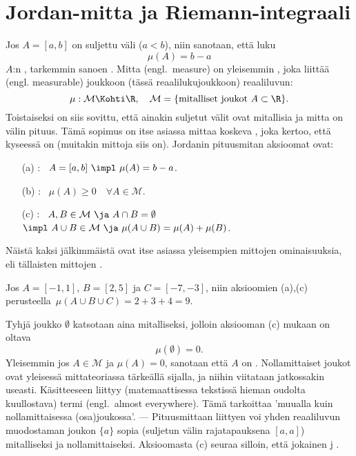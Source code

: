 \section{Jordan-mitta ja Riemann-integraali} \label{jordanin mitta}
\alku

Jos $A=[a,b]$ on suljettu väli ($a<b$), niin sanotaan, että luku
\[
\mu(A) = b-a
\]
$A$:n , tarkemmin sanoen . Mitta (engl.\ measure) on yleisemmin 
, joka liittää  (engl. measurable) joukkoon 
(tässä reaalilukujoukkoon) reaaliluvun:
\[
\mu:\mathcal{M}\Kohti\R,\quad \mathcal{M}=\{\text{mitalliset joukot $A\subset\R$}\}.
\]
Toistaiseksi on siis sovittu, että ainakin suljetut välit ovat mitallisia ja mitta on välin 
pituus. Tämä sopimus on itse asiassa mittaa koskeva , joka kertoo, että kyseessä
on  (muitakin mittoja siis on). Jordanin pituusmitan aksioomat ovat:
\begin{itemize}
\item[(a)] : \ $A=[a,b]\ \impl\ \mu(A)=b-a$.
\item[(b)] : \ $\mu(A)\geq 0\quad\forall A\in\mathcal{M}$.
\item[(c)] : \ $A,B\in\mathcal{M} \ \ja\ A \cap B=\emptyset$ \\[0.25cm]
           $\impl \ A \cup B \in \mathcal{M} \ \ja \ \mu(A \cup B)=\mu(A)+\mu(B)$.
\end{itemize}
Näistä kaksi jälkimmäistä ovat itse asiassa yleisempien  mittojen 
ominaisuuksia, eli tällaisten mittojen .
\begin{Exa} Jos $A=[-1,1]$, $B=[2,5]$ ja $C=[-7,-3]$, niin aksioomien (a),(c) perusteella 
$\,\mu(A \cup B \cup C)=2+3+4=9$. \loppu
\end{Exa}
Tyhjä joukko $\emptyset$ katsotaan aina mitalliseksi, jolloin aksiooman (c) mukaan on oltava
\[
\mu(\emptyset)=0.
\]
Yleisemmin jos $A \in \mathcal{M}$ ja $\mu(A)=0$, sanotaan että $A$ on . 
Nollamittaiset joukot ovat yleisessä mittateoriassa tärkeällä sijalla, ja niihin viitataan 
jatkossakin useasti. Käsitteeseen liittyy (matemaattisessa tekstissä hieman oudolta
kuullostava) termi  (engl.\ almost everywhere). Tämä tarkoittaa
'muualla kuin nollamittaisessa (osa)joukossa'. --- Pituusmittaan liittyen voi yhden 
reaaliluvun muodostaman joukon $\{a\}$ sopia (suljetun välin rajatapauksena $[a,a]$) 
mitalliseksi ja nollamittaiseksi. Aksioomasta (c) seuraa silloin, että jokainen 
 j  .

